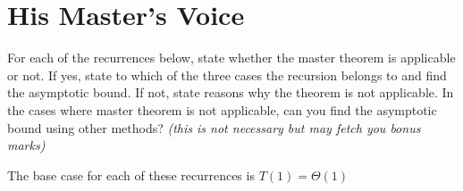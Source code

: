 \documentclass[a4paper,10pt]{article}
\begin{document}
\section{His Master's Voice}

For each of the recurrences below, state whether the master theorem is applicable or not. If yes, state to which of the three cases the recursion belongs to and find the asymptotic bound. If not, state reasons why the theorem is not applicable. In the cases where master theorem is not applicable, can you find the asymptotic bound using other methods? \textit{(this is not necessary but may fetch you bonus marks)}

The base case for each of these recurrences is $T(1) = \Theta(1)$
\end{document}
